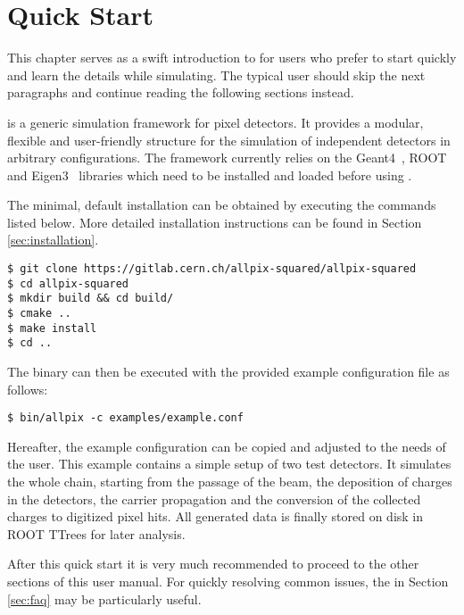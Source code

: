 \section{Quick Start}
This chapter serves as a swift introduction to \apsq for users who prefer to start quickly and learn the details while simulating.
The typical user should skip the next paragraphs and continue reading the following sections instead.

\apsq is a generic simulation framework for pixel detectors.
It provides a modular, flexible and user-friendly structure for the simulation of independent detectors in arbitrary configurations.
The framework currently relies on the Geant4~\cite{geant4}, ROOT~\cite{root} and Eigen3~\cite{eigen3} libraries which need to be installed and loaded before using \apsq.

The minimal, default installation can be obtained by executing the commands listed below.
More detailed installation instructions can be found in Section \ref{sec:installation}.

\begin{verbatim}
$ git clone https://gitlab.cern.ch/allpix-squared/allpix-squared
$ cd allpix-squared
$ mkdir build && cd build/
$ cmake ..
$ make install
$ cd ..
\end{verbatim}
The binary can then be executed with the provided example configuration file as follows:
\begin{verbatim}
$ bin/allpix -c examples/example.conf
\end{verbatim}

Hereafter, the example configuration can be copied and adjusted to the needs of the user.
This example contains a simple setup of two test detectors.
It simulates the whole chain, starting from the passage of the beam, the deposition of charges in the detectors, the carrier propagation and the conversion of the collected charges to digitized pixel hits.
All generated data is finally stored on disk in ROOT TTrees for later analysis.

After this quick start it is very much recommended to proceed to the other sections of this user manual.
For quickly resolving common issues, the  in Section \ref{sec:faq} may be particularly useful.
